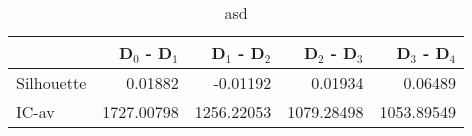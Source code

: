 \begin{table}
\centering
\caption{asd}
\label{tab:delmh-orig-splitmerge-combined}
\begin{tabular}{lrrrr}
\toprule
{} &  D$_0$ - D$_1$ &  D$_1$ - D$_2$ &  D$_2$ - D$_3$ &  D$_3$ - D$_4$ \\
\midrule
Silhouette &        0.01882 &       -0.01192 &        0.01934 &        0.06489 \\
IC-av      &     1727.00798 &     1256.22053 &     1079.28498 &     1053.89549 \\
\bottomrule
\end{tabular}
\end{table}

